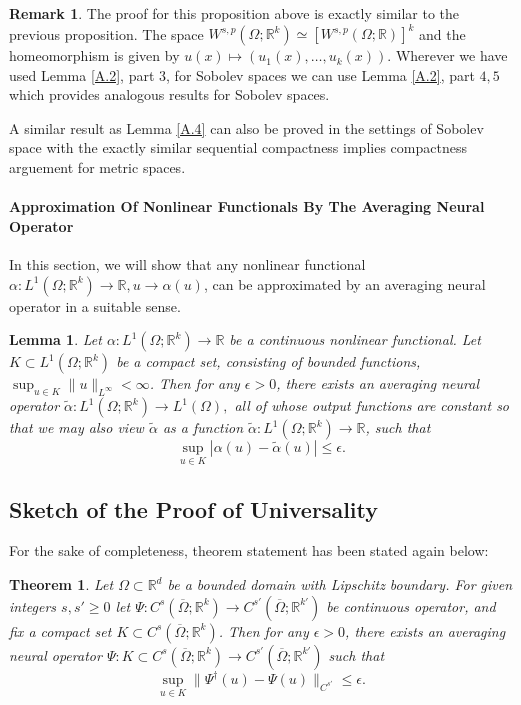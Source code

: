 \documentclass[reqno]{amsart}
\theoremstyle{plain}
\newtheorem{thm}{Theorem}
\newtheorem{lem}{Lemma}
\theoremstyle{definition}
\newtheorem{rem}{Remark}
\newcommand{\bb}[1]{\mathbb{#1}}
\begin{document}
\begin{rem}
    The proof for this proposition above is exactly similar to the previous proposition. The space $W^{s,p}(\Omega;\bb R^k) \simeq [W^{s,p}(\Omega; \bb R)]^k$ and the homeomorphism is given by $u(x) \mapsto (u_1(x),\dots,u_k(x))$. Wherever we have used Lemma \ref{A.2}, part $3$, for Sobolev spaces we can use Lemma \ref{A.2}, part $4,5$ which provides analogous results for Sobolev spaces.

    \noindent A similar result as Lemma \ref{A.4} can also be proved in the settings of Sobolev space with the exactly similar sequential compactness implies compactness arguement for metric spaces.
\end{rem}
\paragraph{\bf Approximation Of Nonlinear Functionals By The Averaging Neural Operator}
In this section, we will show that any nonlinear functional $\alpha: L^1(\Omega; \bb R^k) \to \bb R, u \to \alpha(u)$, can be approximated by an averaging neural operator in a suitable sense.
\begin{lem}\label{A.9}
    Let $\alpha:L^1(\Omega;\bb R^k) \to \bb R$ be a continuous nonlinear functional. Let $K \subset L^1(\Omega; \bb R^k)$ be a compact set, consisting of bounded functions, $\sup_{u \in K} \|u\|_{L^\infty} < \infty$. Then for any $\epsilon > 0$, there exists an averaging neural operator $\tilde{\alpha} : L^1(\Omega; \bb R^k) \to L^1(\Omega),$ all of whose output functions are constant so that we may also view $\tilde{\alpha}$ as a function $\tilde{\alpha} : L^1(\Omega; \bb R^k) \to \bb R$, such that
    $$ \sup\limits_{u \in K} |\alpha(u) - \tilde{\alpha}(u)| \leq \epsilon.$$
\end{lem}




\subsection{Sketch of the Proof of Universality}
For the sake of completeness, theorem statement has been stated again below:
\begin{thm}
    Let $\Omega \subset \bb R^d$ be a bounded domain with Lipschitz boundary. For given integers $s,s' \geq 0$ let $\Psi : C^s(\overline{\Omega};\bb R^k) \to C^{s'}(\overline{\Omega};\bb R^{k'})$ be continuous operator, and fix a compact set $K \subset C^s(\overline{\Omega};\bb R^k)$. Then for any $\epsilon > 0$, there exists an averaging neural operator $\Psi : K \subset C^s(\overline{\Omega};\bb R^k) \to C^{s'}(\overline{\Omega};\bb R^{k'})$ such that 
    $$ \sup\limits_{u \in K}\|\Psi^\dag (u) - \Psi(u)\|_{C^{s'}} \leq \epsilon.$$ 
\end{thm}
\appendix
\end{document}
